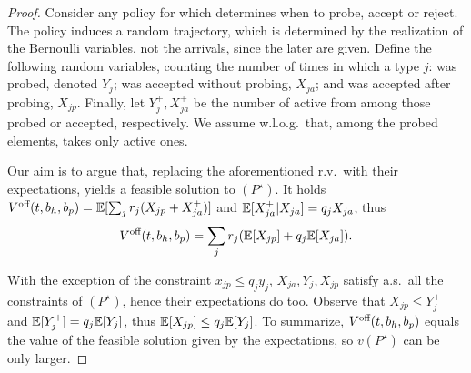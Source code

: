 \documentclass[letterpaper,11pt]{article}
\begin{document}
\begin{proof}
Consider any policy for \off which determines when to probe, accept or reject.
The policy induces a random trajectory, which is determined by the realization of the Bernoulli variables, not the arrivals, since the later are given.
Define the following random variables, counting the number of times in which a type $j$: was probed, denoted $Y_j$; was accepted without probing, $X_{ja}$; and was accepted after probing, $X_{jp}$.
Finally, let $Y_{j}^+,X_{ja}^+$ be the number of active from among those probed or accepted, respectively.
We assume w.l.o.g.\ that, among the probed elements, \off takes only active ones.

Our aim is to argue that, replacing the aforementioned r.v.\ with their expectations, yields a feasible solution to $(P^\star)$.
It holds $V^{\text{off}}(t,b_h,b_p) = \mathbb{E}[\sum_j r_j(X_{jp}+X_{ja}^+)]$ and $\mathbb{E}[X_{ja}^+|X_{ja}]=q_jX_{ja}$, thus
\[
V^{\text{off}}(t,b_h,b_p) = \sum_jr_j(\mathbb{E}[X_{jp}]+q_j\mathbb{E}[X_{ja}]).
\] 

With the exception of the constraint $x_{jp}\leq q_jy_j$, $X_{ja},Y_j,X_{jp}$ satisfy a.s.\ all the constraints of $(P^\star)$, hence their expectations do too.
Observe that $X_{jp}\leq Y_{j}^+$ and $\mathbb{E}[Y_j^+]=q_j\mathbb{E}[Y_j]$, thus $\mathbb{E}[X_{jp}]\leq q_j\mathbb{E}[Y_j]$.
To summarize, $V^{\text{off}}(t,b_h,b_p)$ equals the value of the feasible solution given by the expectations, so $v(P^\star)$ can be only larger.
\end{proof}
\end{document}

